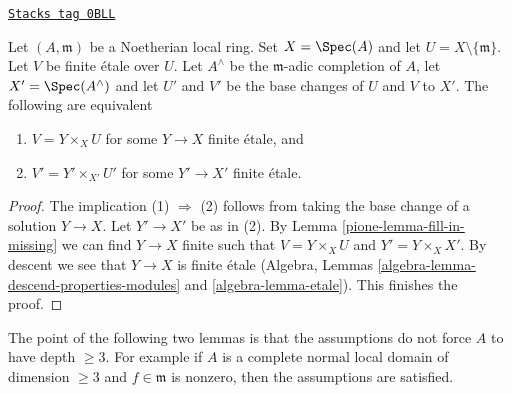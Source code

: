 \begin{lemma}
\label{pione-lemma-purity-and-completion}
\href{https://stacks.math.columbia.edu/tag/0BLL}{\texttt{Stacks tag 0BLL}}

Let $(A, \mathfrak m)$ be a Noetherian local ring. Set $X = \Spec(A)$
and let $U = X \setminus \{\mathfrak m\}$.
Let $V$ be finite \'etale over $U$.
Let $A^\wedge$ be the $\mathfrak m$-adic completion of $A$,
let $X' = \Spec(A^\wedge)$ and let $U'$ and $V'$ be the base changes of
$U$ and $V$ to $X'$. The following are equivalent
\begin{enumerate}
\item $V = Y \times_X U$ for some $Y \to X$ finite \'etale, and
\item $V' = Y' \times_{X'} U'$ for some $Y' \to X'$ finite \'etale.
\end{enumerate}
\end{lemma}

\begin{proof}

The implication (1) $\Rightarrow$ (2) follows from taking the base change
of a solution $Y \to X$. Let $Y' \to X'$ be as in (2).
By Lemma \ref{pione-lemma-fill-in-missing} we can find $Y \to X$ finite
such that $V = Y \times_X U$ and $Y' = Y \times_X X'$.
By descent we see that $Y \to X$ is finite \'etale
(Algebra, Lemmas \ref{algebra-lemma-descend-properties-modules} and
\ref{algebra-lemma-etale}). This finishes the proof.
\end{proof}

The point of the following two lemmas is that the assumptions do not force
$A$ to have depth $\geq 3$. For example if $A$ is a complete normal
local domain of dimension $\geq 3$ and $f \in \mathfrak m$ is nonzero,
then the assumptions are satisfied.

